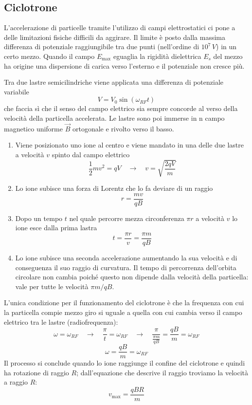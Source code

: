 \documentclass[x11names]{report}
\begin{document}
\subsection{Ciclotrone}
L'accelerazione di particelle tramite l'utilizzo di campi elettrostatici ci pone a delle limitazioni fisiche difficili da aggirare. Il limite è posto dalla massima differenza di potenziale raggiungibile tra due punti (nell'ordine di \(10^7 \, V\)) in un certo mezzo. Quando il campo \(E_\text{max}\) eguaglia la rigidità dielettrica \(E_s\) del mezzo ha origine una dispersione di carica verso l'esterno e il potenziale non cresce più.

Tra due lastre semicilindriche viene applicata una differenza di potenziale variabile
\[
V = V_0\sin(\omega_{RF} t)
\]
che faccia sì che il senso del campo elettrico sia sempre concorde al verso della velocità della particella accelerata. Le lastre sono poi immerse in n campo magnetico uniforme \(\vec{B}\) ortogonale e rivolto verso il basso.

\begin{enumerate}
	\item Viene posizionato uno ione al centro e viene mandato in una delle due lastre a velocità \(v\) spinto dal campo elettrico
	\[
	\frac{1}{2}mv^2 = qV \quad \to\quad v = \sqrt{\frac{2qV}{m}}
	\]
	\item Lo ione subisce una forza di Lorentz che lo fa deviare di un raggio
	\[
	r = \frac{mv}{qB}
	\]
	\item Dopo un tempo \(t\) nel quale percorre mezza circonferenza \(\pi r\) a velocità \(v\) lo ione esce dalla prima lastra
	\[
	t = \frac{\pi r}{v} = \frac{\pi m}{qB}
	\]
	\item Lo ione subisce una seconda accelerazione aumentando la sua velocità e di conseguenza il suo raggio di curvatura. Il tempo di percorrenza dell'orbita circolare non cambia poiché questo non dipende dalla velocità della particella: vale per tutte le velocità \(\pi m/qB\).
\end{enumerate}

L'unica condizione per il funzionamento del ciclotrone è che la frequenza con cui  la particella compie mezzo giro si uguale a quella con cui cambia verso il campo elettrico tra le lastre (radiofrequenza):
\[
\omega = \omega_{RF} \quad \to \quad \frac{\pi}{t} =  \omega_{RF}\quad \to \quad \frac{\pi}{\frac{\pi m}{qB}} = \frac{qB}{m} = \omega_{RF}
\]
\begin{equation}
	\omega = \frac{qB}{m} = \omega_{RF}
\end{equation}
Il processo si conclude quando lo ione raggiunge il confine del ciclotrone e quindi ha rotazione di raggio \(R\); dall'equazione che descrive il raggio troviamo la velocità a raggio \(R\):
\[
v_\text{max} = \frac{qBR}{m}
\]
\end{document}
